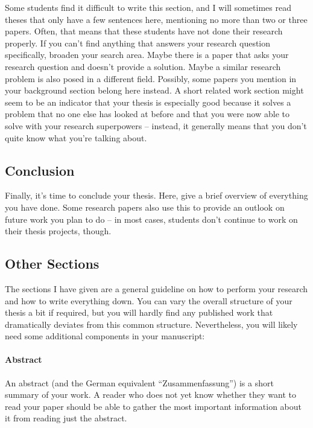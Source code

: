 \documentclass[a4]{article}
\begin{document}
Some students find it difficult to write this section, and I will sometimes read theses that only have a few sentences here, mentioning no more than two or three papers.
Often, that means that these students have not done their research properly.
If you can't find anything that answers your research question specifically, broaden your search area.
Maybe there is a paper that asks your research question and doesn't provide a solution.
Maybe a similar research problem is also posed in a different field.
Possibly, some papers you mention in your background section belong here instead.
A short related work section might seem to be an indicator that your thesis is especially good because it solves a problem that no one else has looked at before and that you were now able to solve with your research superpowers -- instead, it generally means that you don't quite know what you're talking about.

\subsection{Conclusion}

Finally, it's time to conclude your thesis.
Here, give a brief overview of everything you have done.
Some research papers also use this to provide an outlook on future work you plan to do -- in most cases, students don't continue to work on their thesis projects, though.

\subsection{Other Sections}

The sections I have given are a general guideline on how to perform your research and how to write everything down.
You can vary the overall structure of your thesis a bit if required, but you will hardly find any published work that dramatically deviates from this common structure.
Nevertheless, you will likely need some additional components in your manuscript:

\paragraph{Abstract}

An abstract (and the German equivalent ``Zusammenfassung'') is a short summary of your work.
A reader who does not yet know whether they want to read your paper should be able to gather the most important information about it from reading just the abstract.
\end{document}
